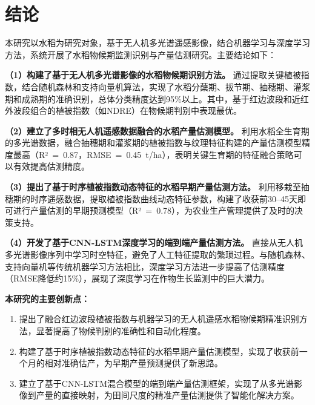
\chapter{结论}
\label{chap:conclusion}

本研究以水稻为研究对象，基于无人机多光谱遥感影像，结合机器学习与深度学习方法，系统开展了水稻物候期监测识别与产量估测研究。主要结论如下：

\vspace{0.3cm}

\textbf{（1）构建了基于无人机多光谱影像的水稻物候期识别方法。}
通过提取关键植被指数，结合随机森林和支持向量机算法，实现了水稻分蘖期、拔节期、抽穗期、灌浆期和成熟期的准确识别，总体分类精度达到95\%以上。其中，基于红边波段和近红外波段组合的植被指数（如NDRE）在物候期判别中表现最优。

\vspace{0.3cm}

\textbf{（2）建立了多时相无人机遥感数据融合的水稻产量估测模型。}
利用水稻全生育期的多光谱数据，融合抽穗期和灌浆期的植被指数与纹理特征构建的产量估测模型精度最高（R²~=~0.87，RMSE~=~0.45~t/ha），表明关键生育期的特征融合策略可以有效提高估测精度。

\vspace{0.3cm}

\textbf{（3）提出了基于时序植被指数动态特征的水稻早期产量估测方法。}
利用移栽至抽穗期的时序遥感数据，提取植被指数曲线动态特征参数，构建了收获前30--45天即可进行产量估测的早期预测模型（R²~=~0.78），为农业生产管理提供了及时的决策支持。

\vspace{0.3cm}

\textbf{（4）开发了基于CNN-LSTM深度学习的端到端产量估测方法。}
直接从无人机多光谱影像序列中学习时空特征，避免了人工特征提取的繁琐过程。与随机森林、支持向量机等传统机器学习方法相比，深度学习方法进一步提高了估测精度（RMSE降低约15\%），展现了深度学习在作物生长监测中的巨大潜力。

\vspace{0.5cm}

\textbf{本研究的主要创新点：}

\begin{enumerate}[itemsep=0pt,parsep=0pt]
  \item 提出了融合红边波段植被指数与机器学习的无人机遥感水稻物候期精准识别方法，显著提高了物候判别的准确性和自动化程度。
  \item 构建了基于时序植被指数动态特征的水稻早期产量估测模型，实现了收获前一个月的相对准确估产，为早期产量预测提供了新思路。
  \item 建立了基于CNN-LSTM混合模型的端到端产量估测框架，实现了从多光谱影像到产量的直接映射，为田间尺度的精准产量估测提供了智能化解决方案。
\end{enumerate}


